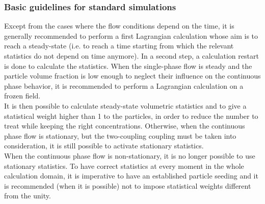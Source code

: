 {{{%
\subsubsection{Basic guidelines for standard simulations}
                                                                                                                                                                                                                                                                                                                                                                                                                                                                                                                                                                                                  
Except from the cases where the flow conditions depend on the time, it is generally recommended to perform a first Lagrangian calculation whose aim is to reach a steady-state (i.e. to reach a time starting from which the relevant statistics do not depend on time anymore). In a second step, a calculation restart is done to calculate the statistics. When the single-phase flow is steady and the particle volume fraction is low enough to neglect their influence on the continuous phase behavior, it is recommended to perform a Lagrangian calculation on a frozen field.\\

 It is then possible to calculate steady-state volumetric statistics and to give a statistical weight higher than 1 to the particles, in order to reduce the number to treat while keeping the right concentrations. Otherwise, when the continuous phase flow is stationary, but the two-coupling coupling must be taken into consideration, it is still possible to activate stationary statistics. \\
                                                                                                                                                                                                                                                                                                 
When the continuous phase flow is non-stationary, it is no longer possible to use stationary statistics. To have correct statistics at every moment in the whole calculation domain, it is imperative to have an established particle seeding and it is recommended (when it is possible) not to impose statistical weights different from the unity. \\

}}}
